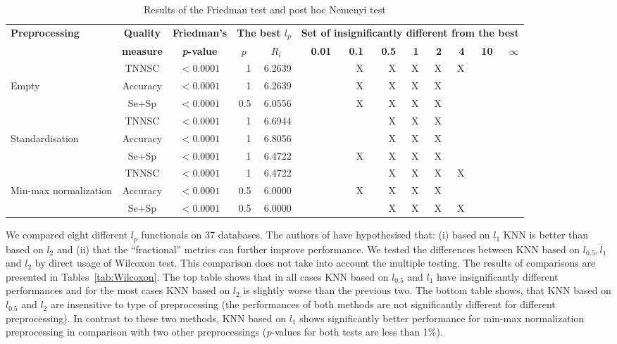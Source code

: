 \documentclass[entropy,article,submit,moreauthors,pdftex]{Definitions/mdpi}
\begin{document}
\begin{table}[tb]
\caption{Results of the Friedman test and post hoc Nemenyi test}
\centering
\begin{tabular}{|l|c|c|r|r|r|r|r|r|r|r|r|r|}
\hline
\textbf{Preprocessing}&\textbf{Quality}&\textbf{Friedman's}& \multicolumn{2}{|c|}{\textbf{The best $l_p$}}&\multicolumn{8}{|c|}{\textbf{Set of insignificantly different from the best}}
\\ \cline{4-13}
&\textbf{measure}&\textbf{\emph{p}-value}&\multicolumn{1}{|c|}{\textbf{$p$}}&\multicolumn{1}{|c|}{\textbf{$R_i$}}&\textbf{0.01}&\textbf{0.1}&\textbf{0.5}&\textbf{1}&\textbf{2}&\textbf{4}&\textbf{10}&$\infty$\\
\hline

 & TNNSC & $<0.0001$ & 1 & 6.2639 &  & X & X & X & X & X &  & \\ \cline{2-13}
Empty & Accuracy & $<0.0001$ & 1 & 6.2639 &  & X & X & X & X &  &  & \\ \cline{2-13}
 & Se+Sp & $<0.0001$ & 0.5 & 6.0556 &  & X & X & X & X &  &  & \\ \hline
 & TNNSC & $<0.0001$ & 1 & 6.6944 &  &  & X & X & X &  &  & \\ \cline{2-13}
Standardisation & Accuracy & $<0.0001$ & 1 & 6.8056 &  &  & X & X & X &  &  & \\ \cline{2-13}
 & Se+Sp & $<0.0001$ & 1 & 6.4722 &  & X & X & X & X &  &  & \\ \hline
 & TNNSC & $<0.0001$ & 1 & 6.4722 &  &  & X & X & X & X &  & \\ \cline{2-13}
Min-max normalization & Accuracy & $<0.0001$ & 0.5 & 6.0000 &  & X & X & X & X &  &  & \\ \cline{2-13}
 & Se+Sp & $<0.0001$ & 0.5 & 6.0000 &  &  & X & X & X & X &  & \\ \hline


\end{tabular}
\label{tab:TestResults}
\end{table}

We compared eight different $l_p$ functionals on 37 databases. The authors of \cite{aggarwal2001} have hypothesised that: (i) based on $l_1$ KNN is better than based on $l_2$ and (ii) that the ``fractional'' metrics can further improve performance. We tested the differences between KNN based on $l_{0.5}, l_1$ and $l_2$  by direct usage of Wilcoxon test. This comparison does not take into account the multiple testing. The results of comparisons are presented in Tables~\ref{tab:Wilcoxon}. The top table shows that in all cases KNN based on $l_{0.5}$ and $l_1$ have insignificantly different performances and for the most cases KNN based on $l_2$ is slightly worse than the previous two. The bottom table shows, that KNN based on $l_{0.5}$ and $l_2$ are insensitive to type of preprocessing (the performances of both methods are not significantly different for different preprocessing). In contrast to these two methods, KNN based on $l_1$ shows significantly better performance for min-max normalization preprocessing in comparison with two other preprocessings (\emph{p}-values for both tests are less than 1\%).
\end{document}
